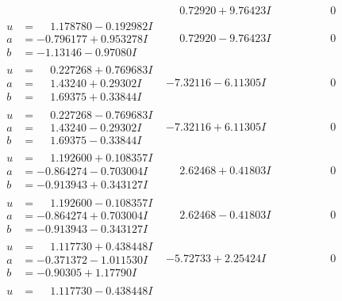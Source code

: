 \documentclass[1p]{elsarticle_modified}
\theoremstyle{definition}
\begin{document}
$$\begin{array}{c|c|c}
 & \phantom{-}0.72920 + 9.76423 I & \phantom{-0.000000 } 0 \\ \hline\begin{aligned}
u &= \phantom{-}1.178780 - 0.192982 I \\
a &= -0.796177 + 0.953278 I \\
b &= -1.13146 - 0.97080 I\end{aligned}
 & \phantom{-}0.72920 - 9.76423 I & \phantom{-0.000000 } 0 \\ \hline\begin{aligned}
u &= \phantom{-}0.227268 + 0.769683 I \\
a &= \phantom{-}1.43240 + 0.29302 I \\
b &= \phantom{-}1.69375 + 0.33844 I\end{aligned}
 & -7.32116 - 6.11305 I & \phantom{-0.000000 } 0 \\ \hline\begin{aligned}
u &= \phantom{-}0.227268 - 0.769683 I \\
a &= \phantom{-}1.43240 - 0.29302 I \\
b &= \phantom{-}1.69375 - 0.33844 I\end{aligned}
 & -7.32116 + 6.11305 I & \phantom{-0.000000 } 0 \\ \hline\begin{aligned}
u &= \phantom{-}1.192600 + 0.108357 I \\
a &= -0.864274 - 0.703004 I \\
b &= -0.913943 + 0.343127 I\end{aligned}
 & \phantom{-}2.62468 + 0.41803 I & \phantom{-0.000000 } 0 \\ \hline\begin{aligned}
u &= \phantom{-}1.192600 - 0.108357 I \\
a &= -0.864274 + 0.703004 I \\
b &= -0.913943 - 0.343127 I\end{aligned}
 & \phantom{-}2.62468 - 0.41803 I & \phantom{-0.000000 } 0 \\ \hline\begin{aligned}
u &= \phantom{-}1.117730 + 0.438448 I \\
a &= -0.371372 - 1.011530 I \\
b &= -0.90305 + 1.17790 I\end{aligned}
 & -5.72733 + 2.25424 I & \phantom{-0.000000 } 0 \\ \hline\begin{aligned}
u &= \phantom{-}1.117730 - 0.438448 I \\

\end{aligned}
\end{array}$$
\end{document}
